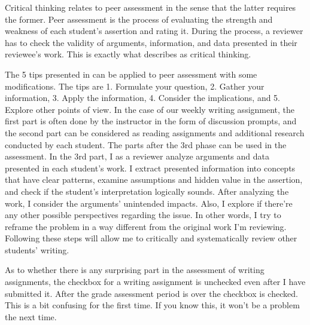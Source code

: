 \documentclass[paper=a4,12pt]{article}
\begin{document}
Critical thinking relates to peer assessment in the sense that the latter requires the former. Peer assessment is the process of evaluating the strength and weakness of each student's assertion and rating it. During the process, a reviewer has to check the validity of arguments, information, and data presented in their reviewee's work. This is exactly what \textcite{anonymous2015} describes as critical thinking.

The 5 tips presented in \textcite{ted-ed2016} can be applied to peer assessment with some modifications. The tips are 1. Formulate your question, 2. Gather your information, 3. Apply the information, 4. Consider the implications, and 5. Explore other points of view. In the case of our weekly writing assignment, the first part is often done by the instructor in the form of discussion prompts, and the second part can be considered as reading assignments and additional research conducted by each student. The parts after the 3rd phase can be used in the assessment. In the 3rd part, I as a reviewer analyze arguments and data presented in each student's work. I extract presented information into concepts that have clear patterns, examine assumptions and hidden value in the assertion, and check if the student's interpretation logically sounds. After analyzing the work, I consider the arguments' unintended impacts. Also, I explore if there're any other possible perspectives regarding the issue. In other words, I try to reframe the problem in a way different from the original work I'm reviewing. Following these steps will allow me to critically and systematically review other students' writing.

As to whether there is any surprising part in the assessment of writing assignments, the checkbox for a writing assignment is unchecked even after I have submitted it. After the grade assessment period is over the checkbox is checked. This is a bit confusing for the first time. If you know this, it won't be a problem the next time.

\printbibliography
\end{document}

